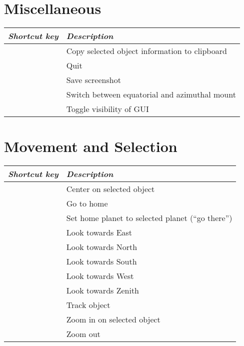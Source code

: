\section{Miscellaneous}
\label{ch:Hotkeys:Miscellaneous}
\begin{longtabu}to \textwidth {rl}
\toprule
\emph{Shortcut key} & \emph{Description}\\\midrule
{}	 	& Copy selected object information to clipboard \\
	 	& Quit \\
	 	& Save screenshot \\
	 	& Switch between equatorial and azimuthal mount \\
	 	& Toggle visibility of GUI \\
\bottomrule
\end{longtabu}

\newpage
\section{Movement and Selection}
\label{ch:Hotkeys:MovementSelection}
\begin{longtabu}to \textwidth {rl} 
\toprule
\emph{Shortcut key} 	& \emph{Description}\\\midrule
\key{\Space}			& Center on selected object \\
			& Go to home \\
			& Set home planet to selected planet (``go there'')\\
			& Look towards East \\
			& Look towards North \\
			& Look towards South \\
			& Look towards West \\
			& Look towards Zenith \\
					& Track object \\
\key{/}					& Zoom in on selected object \\
\key{\textbackslash{}}	& Zoom out \\
\bottomrule
\end{longtabu}

